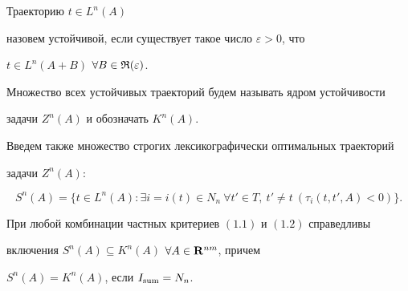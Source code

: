 Траекторию $t\in L^n(A)$ 


назовем устойчивой, если существует такое число $\varepsilon>0$, что 


$t\in L^n(A+B)$ $\forall B\in\frak R(\varepsilon)$. 


 


Множество всех устойчивых траекторий будем называть ядром устойчивости 


задачи $Z^n(A)$ и обозначать $K^n(A)$. 


 


Введем также множество строгих лексикографически оптимальных траекторий 


задачи $Z^n(A)$: 


$$ 


S^n(A)=\{t\in L^n(A):\exists i=i(t)\in N_n\ \forall t'\in T, \ t' 


\ne t\ (\tau_i(t,t',A)<0)\}. 


$$ 


 


\begin{thms} 


При любой комбинации частных критериев $(1.1)$ и $(1.2)$ справедливы 


включения $S^n(A)\subseteq K^n(A)$ $\forall A\in\bold R^{nm}$, причем 


$S^n(A)=K^n(A)$, если $I_{\operatorname{sum}}=N_n$. 


\end{thms} 


 


